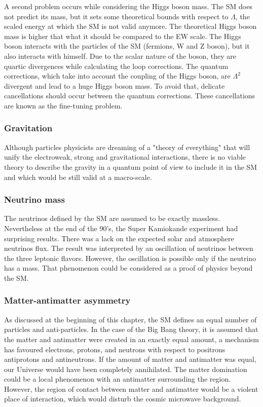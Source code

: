     A second problem occurs while considering the Higgs boson mass.
    The \gls{SM} does not predict its mass, but it sets some theoretical bounds with respect to $\Lambda$, the scaled energy at which the \gls{SM} is not valid anymore.
    The theoretical Higgs boson mass is higher that what it should be compared to the EW scale.
    The Higgs boson interacts with the particles of the \gls{SM} (fermions, W and Z boson), but it also interacts with himself.
    Due to the scalar nature of the boson, they are quartic divergences while calculating the loop corrections.
    The quantum corrections, which take into account the coupling of the Higgs boson, are $\Lambda^2$ divergent and lead to a huge Higgs boson mass.
    To avoid that, delicate cancellations should occur between the quantum corrections.
    These cancellations are known as the fine-tuning problem. 
    
    \subsubsection{Gravitation}

    Although particles physicists are dreaming of a "theory of everything" that will unify the electroweak, strong and gravitational interactions,
    there is no viable theory to describe the gravity in a quantum point of view to include it in the \gls{SM} and which would be still valid at a macro-scale.

    \subsubsection{Neutrino mass}

    The neutrinos defined by the \gls{SM} are assumed to be exactly massless.
    Nevertheless at the end of the 90's, the Super Kamiokande experiment had surprising results.
    There was a lack on the expected solar and atmosphere neutrinos flux. 
    The result was interpreted by an oscillation of neutrinos between the three leptonic flavors.
    However, the oscillation is possible only if the neutrino has a mass.
    That phenomenon could be considered as a proof of physics beyond the \gls{SM}.

    \subsubsection{Matter-antimatter asymmetry}

    As discussed at the beginning of this chapter, the \gls{SM} defines an equal number of particles and anti-particles. 
    In the case of the Big Bang theory, it is assumed that the matter and antimatter were created in an exactly equal amount, a mechanism has favoured electrons, protons, and neutrons with respect to positrons antiprotons and antineutrons.
    If the amount of matter and antimatter was equal, our Universe would have been completely annihilated.
    The matter domination could be a local phenomenon with an antimatter surrounding the region. 
    However, the region of contact between matter and antimatter would be a violent place of interaction, which would disturb the cosmic microwave background.

